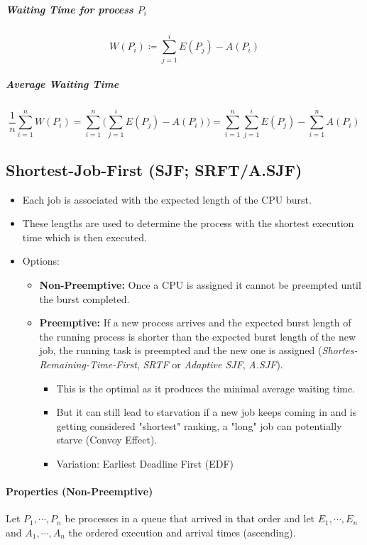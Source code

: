 \subparagraph{Waiting Time for process \(P_i\)}
	\begin{equation*}
		W(P_i) \coloneqq \sum_{j = 1}^{i} E(P_j) - A(P_i)
	\end{equation*}

	\subparagraph{Average Waiting Time}
		\begin{equation*}
			\frac{1}{n} \sum_{i = 1}^{n} W(P_i) = \sum_{i = 1}^{n} \Bigg(\sum_{j = 1}^{i} E(P_j) - A(P_i)\Bigg) = \sum_{i = 1}^{n} \sum_{j = 1}^{i} E(P_j) - \sum_{i = 1}^{n} A(P_i)
		\end{equation*}

\subsection{Shortest-Job-First (SJF; SRFT/A.SJF)}
\begin{itemize}
	\item Each job is associated with the expected length of the CPU burst.
	\item These lengths are used to determine the process with the shortest execution time which is then executed.
	\item Options:
		\begin{itemize}
			\item \textbf{Non-Preemptive:} Once a CPU is assigned it cannot be preempted until the burst completed.
			\item \textbf{Preemptive:} If a new process arrives and the expected burst length of the running process is shorter than the expected burst length of the new job, the running task is preempted and the new one is assigned (\textit{Shortes-Remaining-Time-First}, \textit{SRTF} or \textit{Adaptive SJF}, \textit{A.SJF}).
				\begin{itemize}
					\item This is the optimal as it produces the minimal average waiting time.
					\item But it can still lead to starvation if a new job keeps coming in and is getting considered "shortest" ranking, a "long" job can potentially starve (Convoy Effect).
					\item Variation: Earliest Deadline First (EDF)
				\end{itemize}
		\end{itemize}
\end{itemize}

\paragraph{Properties (Non-Preemptive)}
Let \( P_1, \cdots, P_n \) be processes in a queue that arrived in that order and let \( E_1, \cdots, E_n \) and \( A_1, \cdots, A_n \) the ordered execution and arrival times (ascending).


